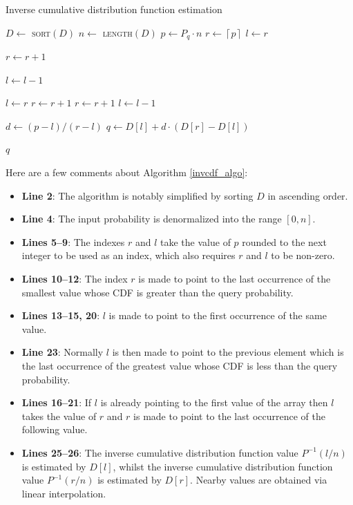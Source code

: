 \documentclass[10pt,final]{siamltex}
\begin{document}
\begin{algorithm}
  \caption{Inverse cumulative distribution function estimation}
  \label{invcdf_algo}
  \begin{algorithmic}[1]
    \State $D \gets$ \textsc{sort}$(D)$
    \State $n \gets$ \textsc{length}$(D)$
    \State $p \gets P_q \cdot n$
    \State $r \gets  \left \lceil{p}\right \rceil$
    \EndIf
    \State $l \gets r$

    \State $ r \gets r + 1$
    \EndWhile

    \State $l \gets l - 1$
    \EndWhile

    \State $l \gets r$
    \State $r \gets r+1$
    \State $r \gets r + 1$
    \EndWhile
    \Else
    \State $ l \gets l - 1$
    \EndIf

    \State $d \gets (p-l)/(r-l) $
    \State $q \gets D[l] + d \cdot (D[r]-D[l])$

    \State \Return $q$
    \EndFunction
  \end{algorithmic}
\end{algorithm}

Here are a few comments about Algorithm \ref{invcdf_algo}:
\begin{itemize}
  \item \textbf{Line 2}: The algorithm is notably simplified by sorting $D$ in ascending order.
  \item \textbf{Line 4}: The input probability is denormalized into the range $[0, n]$.
  \item \textbf{Lines 5--9}: The indexes $r$ and $l$ take the value of $p$ rounded to the next integer to be used as an index, which also requires $r$ and $l$ to be non-zero.
  \item \textbf{Lines 10--12}: The index $r$ is made to point to the last occurrence of the smallest value whose CDF is greater than the query probability.
  \item \textbf{Lines 13--15, 20}: $l$ is made to point to the first occurrence of the same value.
  \item \textbf{Line 23}: Normally $l$ is then made to point to the previous element which is the last occurrence of the greatest value whose CDF is less than the query probability.
  \item \textbf{Lines 16--21}: If $l$ is already pointing to the first value of the array then $l$ takes the value of $r$ and $r$ is made to point to the last occurrence of the following value.
  \item \textbf{Lines 25--26}: The inverse cumulative distribution function value $P^{-1}(l/n)$ is estimated by $D[l]$, whilst the inverse cumulative distribution function value $P^{-1}(r/n)$ is estimated by $D[r]$. Nearby values are obtained via linear interpolation.
\end{itemize}
%
\end{document}

